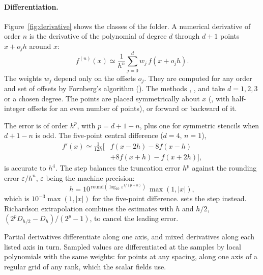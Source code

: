 \paragraph{Differentiation.}
Figure~\ref{fig:derivative} shows the classes of the folder.
A numerical derivative of order $n$ is the derivative of the polynomial of degree $d$ through $d+1$ points
$x+o_j h$ around $x$:
\begin{equation}
f^{(n)}(x) \simeq \frac{1}{h^n}\sum_{j=0}^{d} w_j\, f(x+o_j h).
\end{equation}
The weights $w_j$ depend only on the offsets $o_j$. They are computed for any order and set of offsets by Fornberg's
algorithm (). The methods , ,  and
 take $d=1,2,3$ or a chosen degree. The points are placed symmetrically about $x$ (,
with half-integer offsets for an even number of points), or forward or backward of it.

The error is of order $h^p$, with $p=d+1-n$, plus one for symmetric stencils when $d+1-n$ is odd. The five-point
central difference ($d=4$, $n=1$),
\begin{equation}
\begin{aligned}
f'(x) \simeq \frac{1}{12h}\big[&f(x-2h)-8f(x-h)\\
&+8f(x+h)-f(x+2h)\big],
\end{aligned}
\end{equation}
is accurate to $h^4$. The step balances the truncation error $h^p$ against the rounding error $\varepsilon/h^n$,
$\varepsilon$ being the machine precision:
\begin{equation}
h = 10^{\,\mathrm{round}(\log_{10}\varepsilon^{1/(p+n)})}\,\max(1,|x|),
\end{equation}
which is $10^{-3}\max(1,|x|)$ for the five-point difference.  sets the step instead. Richardson extrapolation combines the estimates with
$h$ and $h/2$, $(2^p D_{h/2}-D_h)/(2^p-1)$, to cancel the leading error.

Partial derivatives differentiate along one axis, and mixed derivatives along each listed axis in turn. Sampled
values are differentiated at the samples by local polynomials with the same weights:  for
points at any spacing,  along one axis of a regular grid of any rank, which the scalar fields
use.

